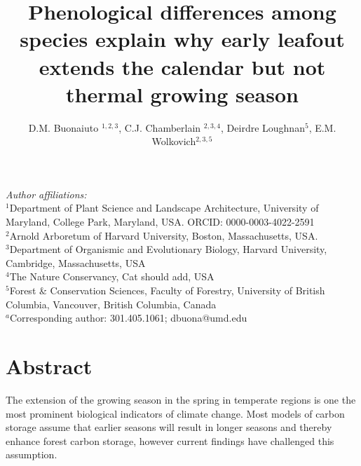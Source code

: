 \documentclass{article}[12pt]
\title{Phenological differences among species explain why early leafout extends the calendar but not thermal growing season}
\author{D.M. Buonaiuto $^{1,2,3}$, C.J. Chamberlain $^{2,3,4}$,
Deirdre Loughnan$^{5}$, E.M. Wolkovich$^{2,3,5}$}
\begin{document}



\maketitle

\noindent \emph{Author affiliations:}\\
\noindent $^1$Department of Plant Science and Landscape Architecture, University of Maryland, College Park, Maryland, USA. ORCID: 0000-0003-4022-2591\\
\noindent $^2$Arnold Arboretum of Harvard University, Boston, Massachusetts, USA.\\
$^3$Department of Organismic and Evolutionary Biology, Harvard University, Cambridge, Massachusetts, USA \\
$^4$The Nature Conservancy, Cat should add, USA \\
$^5$Forest \& Conservation Sciences, Faculty of Forestry, University of British Columbia, Vancouver, British Columbia, Canada\\
$^a$Corresponding author: 301.405.1061; dbuona@umd.edu\\


\setlength{\parindent}{0pt}




\section{Abstract}
The extension of the growing season in the spring in temperate regions is one the most prominent biological indicators of climate change. Most models of carbon storage assume that earlier seasons will result in longer seasons and thereby enhance forest carbon storage, however current findings have challenged this assumption.
\end{document}
